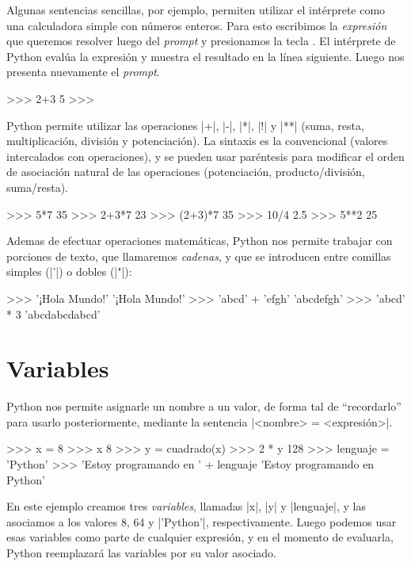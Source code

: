 Algunas sentencias sencillas, por ejemplo, permiten utilizar el intérprete como
una calculadora simple con números enteros. Para esto escribimos la {\it
expresión} que queremos resolver luego del {\it prompt} y presionamos la tecla
. El intérprete de Python evalúa la expresión y muestra el
resultado en la línea siguiente. Luego nos presenta nuevamente el {\it prompt}.

\begin{codigo-python-sn}
>>> 2+3
5
>>>
\end{codigo-python-sn}

Python permite utilizar las operaciones |+|, |-|, |*|, |!| y |**|
(suma, resta, multiplicación, división y potenciación). La sintaxis es la
convencional (valores intercalados con operaciones), y se pueden usar
paréntesis para modificar el orden de asociación natural de las operaciones
(potenciación, producto/división, suma/resta).

\begin{codigo-python-sn}
>>> 5*7
35
>>> 2+3*7
23
>>> (2+3)*7
35
>>> 10/4
2.5
>>> 5**2
25
\end{codigo-python-sn}

Ademas de efectuar operaciones matemáticas, Python nos permite trabajar con
porciones de texto, que llamaremos {\it cadenas}, y que se introducen entre
comillas simples (|'|) o dobles (|"|):

\begin{codigo-python-sn}
>>> '¡Hola Mundo!'
'¡Hola Mundo!'
>>> 'abcd' + 'efgh'
'abcdefgh'
>>> 'abcd' * 3
'abcdabcdabcd'
\end{codigo-python-sn}

\section{Variables}

Python nos permite asignarle un nombre a un valor, de forma tal de
``recordarlo'' para usarlo posteriormente, mediante la sentencia
|<nombre> = <expresión>|.

\begin{codigo-python-sn}
>>> x = 8
>>> x
8
>>> y = cuadrado(x)
>>> 2 * y
128
>>> lenguaje = 'Python'
>>> 'Estoy programando en ' + lenguaje
'Estoy programando en Python'
\end{codigo-python-sn}

En este ejemplo creamos tres {\it variables}, llamadas |x|, |y| y |lenguaje|, y
las asociamos a los valores 8, 64 y |'Python'|, respectivamente. Luego podemos
usar esas variables como parte de cualquier expresión, y en el momento de
evaluarla, Python reemplazará las variables por su valor asociado.

